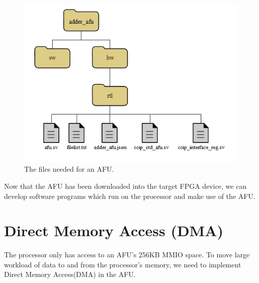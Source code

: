 \documentclass[11pt, twoside, pdftex]{article}
\begin{document}
\begin{figure}[H]
  \begin{center}
      \includegraphics[scale=0.8]{figures/fig6.png}
  \end{center}
  \caption{The files needed for an AFU.}
	\label{fig:files}
\end{figure}


\noindent
Now that the AFU has been downloaded into the target FPGA device, we can develop software 
programs which run on the processor and make use of the AFU.

\section{Direct Memory Access (DMA)}
The processor only has access to an AFU's 256KB MMIO space. To move large workload of data to and from the processor's memory, we need to implement Direct Memory Access(DMA) in the AFU.
\end{document}

